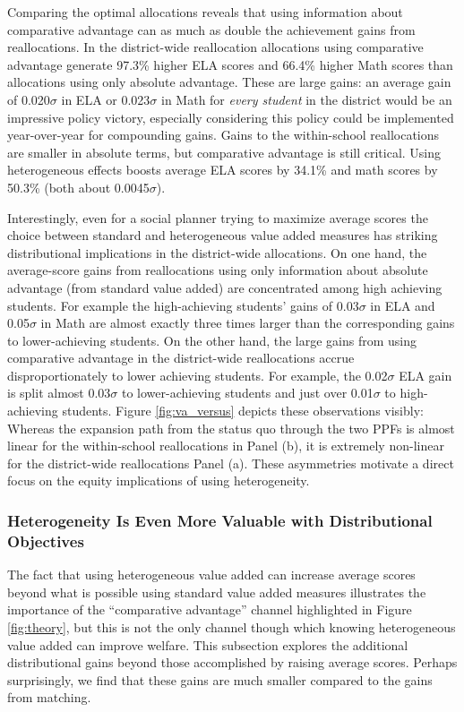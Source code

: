 \documentclass[12pt]{article}
\theoremstyle{definition}
\theoremstyle{definition}
\theoremstyle{definition}
\theoremstyle{definition}
\begin{document}
Comparing the optimal allocations reveals that using information about comparative advantage can as much as double the achievement gains from reallocations. In the district-wide reallocation allocations using comparative advantage generate 97.3\% higher ELA scores and 66.4\% higher Math scores than allocations using only absolute advantage. These are large gains: an average gain of 0.020$\sigma$ in ELA or 0.023$\sigma$ in Math for \textit{every student} in the district would be an impressive policy victory, especially considering this policy could be implemented year-over-year for compounding gains. Gains to the within-school reallocations are smaller in absolute terms, but comparative advantage is still critical. Using heterogeneous effects boosts average ELA scores by 34.1\% and math scores by 50.3\% (both about 0.0045$\sigma$).

Interestingly, even for a social planner trying to maximize average scores the choice between standard and heterogeneous value added measures has striking distributional implications in the district-wide allocations. On one hand, the average-score gains from reallocations using only information about absolute advantage (from standard value added) are concentrated among high achieving students. For example the high-achieving students' gains of 0.03$\sigma$ in ELA  and 0.05$\sigma$ in Math are almost exactly three times larger than the corresponding gains to lower-achieving students.  On the other hand, the large gains from using comparative advantage in the  district-wide reallocations accrue disproportionately to lower achieving students. For example, the 0.02$\sigma$ ELA gain is split almost 0.03$\sigma$ to lower-achieving students and just over 0.01$\sigma$ to high-achieving students. Figure \ref{fig:va_versus} depicts these observations visibly: Whereas the expansion path from the status quo through the two PPFs is almost linear for the within-school reallocations in Panel (b), it is extremely non-linear for the district-wide reallocations Panel (a). These asymmetries motivate a direct focus on the equity implications of using heterogeneity.



\subsubsection{Heterogeneity Is Even More Valuable with Distributional Objectives}

The fact that using heterogeneous value added can increase average scores beyond what is possible using standard value added measures illustrates the importance of the ``comparative advantage'' channel highlighted in Figure \ref{fig:theory}, but this is not the only channel though which knowing heterogeneous value added can improve welfare. This subsection explores the additional distributional gains beyond those accomplished by raising average scores. Perhaps surprisingly, we find that these gains are much smaller compared to the gains from matching.
\end{document}
